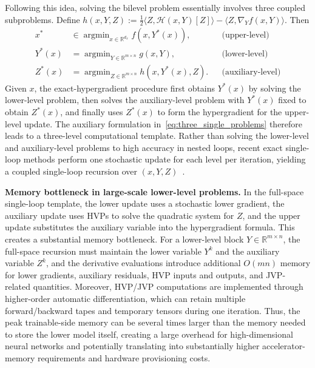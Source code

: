\documentclass{pkumelon}
\theoremstyle{plain}
\DeclareMathOperator{\argmin}{argmin}
\begin{document}
Following this idea, solving the bilevel problem essentially involves three coupled subproblems. Define $h(x,Y,Z):=\frac{1}{2}\langle Z,\mathcal H(x,Y)[Z]\rangle-\langle Z,\nabla_Y f(x,Y)\rangle$. Then
\begin{subequations}
\label{eq:three_single_problems}
\begin{align}
x^*&\in\argmin_{x\in\mathbb R^{d_x}} f(x,Y^*(x)), &&\text{(upper-level)}\label{eq:single_upper_problem}\\
Y^*(x)&=\argmin_{Y\in\mathbb R^{m\times n}} g(x,Y), &&\text{(lower-level)}\label{eq:single_lower_problem}\\
Z^*(x)&=\argmin_{Z\in\mathbb R^{m\times n}} h(x,Y^*(x),Z). &&\text{(auxiliary-level)}\label{eq:single_aux_problem}
\end{align}
\end{subequations}
Given $x$, the exact-hypergradient procedure first obtains $Y^*(x)$ by solving the lower-level problem, then solves the auxiliary-level problem with $Y^*(x)$ fixed to obtain $Z^*(x)$, and finally uses $Z^*(x)$ to form the hypergradient for the upper-level update. The auxiliary formulation in~\eqref{eq:three_single_problems} therefore leads to a three-level computational template. Rather than solving the lower-level and auxiliary-level problems to high accuracy in nested loops, recent exact single-loop methods perform one stochastic update for each level per iteration, yielding a coupled single-loop recursion over $(x,Y,Z)$~\citep{dagreou2022framework,chen2024optimal}.

\textbf{Memory bottleneck in large-scale lower-level problems. }In the full-space single-loop template, the lower update uses a stochastic lower gradient, the auxiliary update uses HVPs to solve the quadratic system for $Z$, and the upper update substitutes the auxiliary variable into the hypergradient formula. This creates a substantial memory bottleneck. For a lower-level block $Y\in\mathbb R^{m\times n}$, the full-space recursion must maintain the lower variable $Y^k$ and the auxiliary variable $Z^k$, and the derivative evaluations introduce additional $O(mn)$ memory for lower gradients, auxiliary residuals, HVP inputs and outputs, and JVP-related quantities. Moreover, HVP/JVP computations are implemented through higher-order automatic differentiation, which can retain multiple forward/backward tapes and temporary tensors during one iteration. Thus, the peak trainable-side memory can be several times larger than the memory needed to store the lower model itself, creating a large overhead for high-dimensional neural networks and potentially translating into substantially higher accelerator-memory requirements and hardware provisioning costs.
\end{document}
